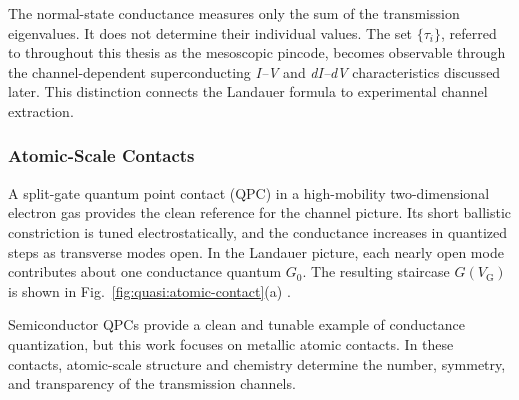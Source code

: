             The normal-state conductance measures only the sum of the transmission eigenvalues. It does not determine their individual values. The set $\{\tau_i\}$, referred to throughout this thesis as the mesoscopic pincode, becomes observable through the channel-dependent superconducting \textit{I--V} and \textit{dI--dV} characteristics discussed later. This distinction connects the Landauer formula to experimental channel extraction. \cite{scheer_conduction_1997,beenakker_random-matrix_1997}

        \subsubsection*{Atomic-Scale Contacts}

            A split-gate quantum point contact (QPC) in a high-mobility two-dimensional electron gas provides the clean reference for the channel picture. Its short ballistic constriction is tuned electrostatically, and the conductance increases in quantized steps as transverse modes open. In the Landauer picture, each nearly open mode contributes about one conductance quantum $G_0$. The resulting staircase $G(V_\mathrm{G})$ is shown in Fig.~\ref{fig:quasi:atomic-contact}(a) \cite{van_wees_quantized_1988,wharam_one-dimensional_1988}.

            Semiconductor QPCs provide a clean and tunable example of conductance quantization, but this work focuses on metallic atomic contacts. In these contacts, atomic-scale structure and chemistry determine the number, symmetry, and transparency of the transmission channels.

